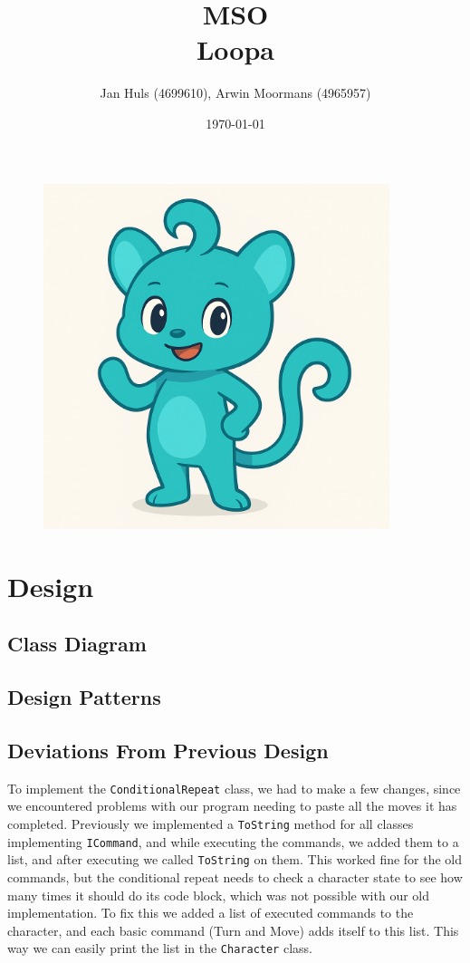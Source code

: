 \documentclass[11pt,a4paper]{article}
\date{\monthyear\today}
\title{\textbf{MSO \\ Loopa}}
\author{Jan Huls (4699610), Arwin Moormans (4965957)}
\begin{document}
 
    \maketitle
    \begin{figure}[htbp]
        \centering
        \includegraphics[width=0.9\textwidth]{mascot}
        \label{image-mascot}
    \end{figure}
    \newpage
    \section*{Design}
    \subsection*{Class Diagram}
    \subsection*{Design Patterns}
    \subsection*{Deviations From Previous Design}
    To implement the \texttt{ConditionalRepeat} class, we had to make a few changes, since we encountered problems with our program needing to paste all the moves it has completed. 
    Previously we implemented a \texttt{ToString} method for all classes implementing \texttt{ICommand}, and while executing the commands, we added them to a list, and after executing we called \texttt{ToString} on them.
    This worked fine for the old commands, but the conditional repeat needs to check a character state to see how many times it should do its code block, which was not possible with our old implementation. 
    To fix this we added a list of executed commands to the character, and each basic command (Turn and Move) adds itself to this list.
    This way we can easily print the list in the \texttt{Character} class. 
    
\end{document}
